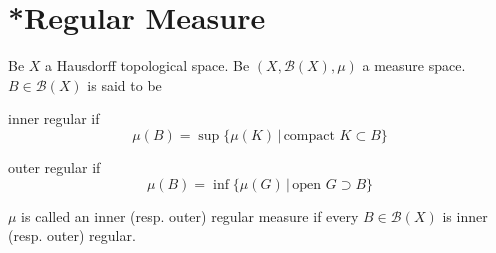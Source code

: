 \documentclass[11pt, a4paper, openany]{book}
\theoremstyle{definition}
\newenvironment{tight_enumerate}{\begin{enumerate}\itemsep -0.2em}{\end{enumerate}}
\begin{document}
\section{*Regular Measure}
    Be $X$ a Hausdorff topological space. Be $(X,\mathscr{B}(X),\mu)$ a measure space. $B\in\mathscr{B}(X)$ is said to be
    \begin{tight_enumerate}
        \item inner regular if
        \[\mu(B)=\sup\{\mu(K)\,|\,\text{compact }K\subset B\}\]
        \item outer regular if 
        \[\mu(B)=\inf\{\mu(G)\,|\,\text{open }G\supset B\}\]
    \end{tight_enumerate}
    $\mu$ is called an inner (resp. outer) regular measure if every $B\in\mathscr{B}(X)$ is inner (resp. outer) regular.
\end{document}
